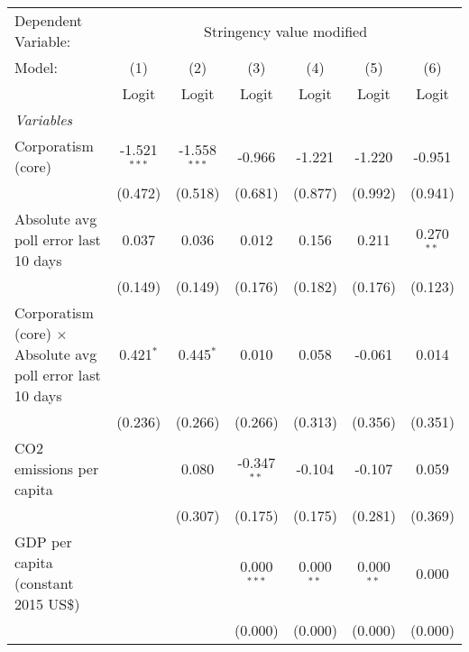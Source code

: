 
\begingroup
\centering
\begin{tabular}{lcccccc}
   \toprule
   Dependent Variable: & \multicolumn{6}{c}{Stringency value modified}\\
   Model:                                                            & (1)            & (2)            & (3)           & (4)          & (5)          & (6)\\  
                                                                     &  Logit         & Logit          & Logit         & Logit        & Logit        & Logit\\  
   \midrule
   \emph{Variables}\\
   Corporatism (core)                                                & -1.521$^{***}$ & -1.558$^{***}$ & -0.966        & -1.221       & -1.220       & -0.951\\   
                                                                     & (0.472)        & (0.518)        & (0.681)       & (0.877)      & (0.992)      & (0.941)\\   
   Absolute avg poll error last 10 days                              & 0.037          & 0.036          & 0.012         & 0.156        & 0.211        & 0.270$^{**}$\\   
                                                                     & (0.149)        & (0.149)        & (0.176)       & (0.182)      & (0.176)      & (0.123)\\   
   Corporatism (core) $\times$ Absolute avg poll error last 10 days  & 0.421$^{*}$    & 0.445$^{*}$    & 0.010         & 0.058        & -0.061       & 0.014\\   
                                                                     & (0.236)        & (0.266)        & (0.266)       & (0.313)      & (0.356)      & (0.351)\\   
   CO2 emissions per capita                                          &                & 0.080          & -0.347$^{**}$ & -0.104       & -0.107       & 0.059\\   
                                                                     &                & (0.307)        & (0.175)       & (0.175)      & (0.281)      & (0.369)\\   
   GDP per capita (constant 2015 US\$)                               &                &                & 0.000$^{***}$ & 0.000$^{**}$ & 0.000$^{**}$ & 0.000\\   
                                                                     &                &                & (0.000)       & (0.000)      & (0.000)      & (0.000)\\   

\end{tabular}
